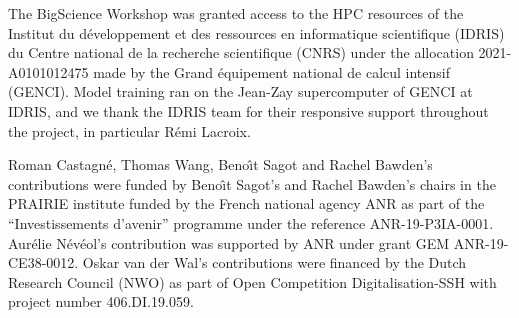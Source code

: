 \begin{acks}
The BigScience Workshop was granted access to the HPC resources of the Institut du développement et des ressources en informatique scientifique (IDRIS) du Centre national de la recherche scientifique (CNRS) under the allocation 2021-A0101012475 made by the Grand équipement national de calcul intensif (GENCI). Model training ran on the Jean-Zay supercomputer of GENCI at IDRIS, and we thank the IDRIS team for their responsive support throughout the project, in particular Rémi Lacroix.

Roman Castagné, Thomas Wang, Beno\^\i t Sagot and Rachel Bawden's contributions were funded by Beno\^\i t Sagot's and Rachel Bawden's chairs in the PRAIRIE institute funded by the French national agency ANR as part of the ``Investissements d’avenir'' programme under the reference ANR-19-P3IA-0001.
Aur\'elie N\'ev\'eol's contribution was supported by ANR under grant GEM ANR-19-CE38-0012. Oskar van der Wal's contributions were financed by the Dutch Research Council (NWO) as part of Open Competition Digitalisation-SSH with project number 406.DI.19.059.


\end{acks}
